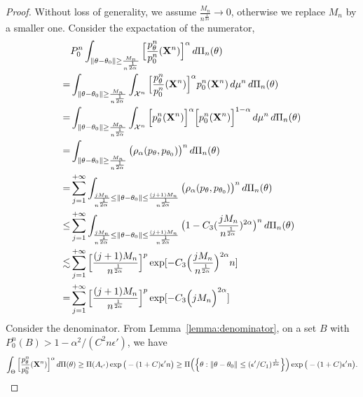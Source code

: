 \documentclass[11pt, letterpaper]{article}
\theoremstyle{plain}
\theoremstyle{definition}
\theoremstyle{remark}
\begin{document}
\begin{proof}
    Without loss of generality, we assume $\frac{M_n}{n^{\frac{1}{2\alpha}}}\to 0$, otherwise we replace $M_n$ by a smaller one.
Consider the expactation of the numerator,
    $$
    \begin{aligned}
        &P_0^n\int_{\|\theta-\theta_0\|\geq \frac{M_n}{n^{\frac{1}{2\alpha}}} } \Big[ \frac{p_{\theta}^n}{p_0^n} (\mathbf{X}^n) \Big]^{\alpha} \, d \Pi_n(\theta)
        \\
        =&
        \int_{\|\theta-\theta_0\|\geq \frac{M_n}{n^{\frac{1}{2\alpha}}} } \int_{\mathcal{X}^n}\Big[ \frac{p^n_{\theta}}{p_0^n} (\mathbf{X}^n) \Big]^{\alpha} p_0^n (\mathbf{X}^n)\, d\mu^n \, d \Pi_n(\theta)\\
        =&
        \int_{\|\theta-\theta_0\|\geq \frac{M_n}{n^{\frac{1}{2\alpha}}} } \int_{\mathcal{X}^n}\Big[ {p^n_{\theta}} (\mathbf{X}^n) \Big]^{\alpha}  \Big[ p_0^n (\mathbf{X}^n) \Big]^{1-\alpha} \, d\mu^n \, d \Pi_n(\theta)\\
        =&
        \int_{\|\theta-\theta_0\|\geq \frac{M_n}{n^{\frac{1}{2\alpha}}} } \big( \rho_{\alpha}(p_{\theta},p_{\theta_0}) \big)^n \, d \Pi_n(\theta)\\
        =&
        \sum_{j=1}^{+\infty} \int_{\frac{j M_n}{n^{\frac{1}{2\alpha}}} \leq \|\theta-\theta_0\|\leq \frac{(j+1)M_n}{n^{\frac{1}{2\alpha}}} } \big( \rho_{\alpha}(p_{\theta},p_{\theta_0}) \big)^n \, d \Pi_n(\theta)
        \\
        \leq&
        \sum_{j=1}^{+\infty} \int_{\frac{j M_n}{n^{\frac{1}{2\alpha}}} \leq \|\theta-\theta_0\|\leq \frac{(j+1)M_n}{n^{\frac{1}{2\alpha}}} } \big( 1- C_3 (\frac{jM_n}{n^{\frac{1}{2\alpha}}})^{2\alpha} \big)^n \, d \Pi_n(\theta)
        \\
        \lesssim&
        \sum_{j=1}^{+\infty}
        \Big[\frac{(j+1)M_n}{n^{\frac{1}{2\alpha}}}\Big]^p
        \exp[- C_3 \Big(\frac{jM_n}{n^{\frac{1}{2\alpha}}}\Big)^{2\alpha}n]
        \\
        =&
        \sum_{j=1}^{+\infty}
        \Big[\frac{(j+1)M_n}{n^{\frac{1}{2\alpha}}}\Big]^p
        \exp[- C_3 \Big({jM_n}\Big)^{2\alpha}]
    \end{aligned}
    $$
    Consider the denominator.
     From Lemma~\ref{lemma:denominator}, on a set $B$ with $P_0^n(B)>1-\alpha^2/(C^2 n \epsilon')$, we have
     $$
     \int_{\Theta}\Big[\frac{p_{\theta}^n}{p_0^n}(\mathbf{X}^n)\Big]^{\alpha} \, d\Pi(\theta)
     \geq \Pi(A_{\epsilon'}) \exp \big(-(1+C)\epsilon' n\big)
     \geq \Pi\Big(\Big\{\theta: \|\theta-\theta_0\|\leq (\epsilon'/C_1)^{\frac{1}{2\alpha}}\Big\}\Big) \exp \big(-(1+C)\epsilon' n\big).
$$
\end{proof}
\end{document}
